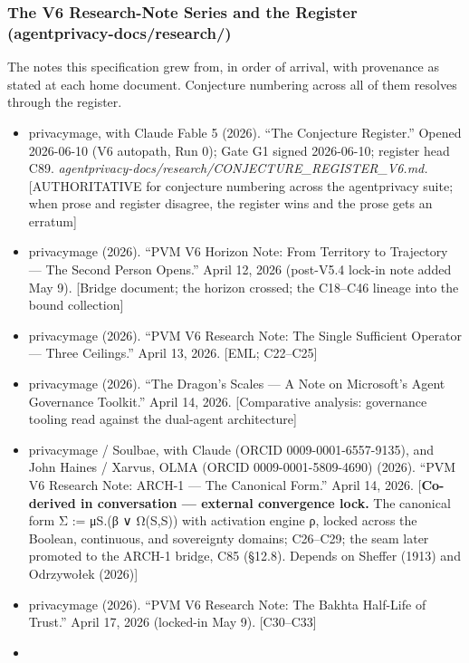 \documentclass[
  11pt,
]{article}
\providecommand{\tightlist}{%
  \setlength{\itemsep}{0pt}\setlength{\parskip}{0pt}}
\begin{document}
\subsubsection{The V6 Research-Note Series and the Register
(agentprivacy-docs/research/)}\label{the-v6-research-note-series-and-the-register-agentprivacy-docsresearch}

The notes this specification grew from, in order of arrival, with
provenance as stated at each home document. Conjecture numbering across
all of them resolves through the register.

\begin{itemize}
\tightlist
\item
  privacymage, with Claude Fable 5 (2026). ``The Conjecture Register.''
  Opened 2026-06-10 (V6 autopath, Run 0); Gate G1 signed 2026-06-10;
  register head C89.
  \emph{agentprivacy-docs/research/CONJECTURE\_REGISTER\_V6.md.}
  {[}AUTHORITATIVE for conjecture numbering across the agentprivacy
  suite; when prose and register disagree, the register wins and the
  prose gets an erratum{]}
\item
  privacymage (2026). ``PVM V6 Horizon Note: From Territory to
  Trajectory --- The Second Person Opens.'' April 12, 2026 (post-V5.4
  lock-in note added May 9). {[}Bridge document; the horizon crossed;
  the C18--C46 lineage into the bound collection{]}
\item
  privacymage (2026). ``PVM V6 Research Note: The Single Sufficient
  Operator --- Three Ceilings.'' April 13, 2026. {[}EML; C22--C25{]}
\item
  privacymage (2026). ``The Dragon's Scales --- A Note on Microsoft's
  Agent Governance Toolkit.'' April 14, 2026. {[}Comparative analysis:
  governance tooling read against the dual-agent architecture{]}
\item
  privacymage / Soulbae, with Claude (ORCID 0009-0001-6557-9135), and
  John Haines / Xarvus, OLMA (ORCID 0009-0001-5809-4690) (2026). ``PVM
  V6 Research Note: ARCH-1 --- The Canonical Form.'' April 14, 2026.
  {[}\textbf{Co-derived in conversation --- external convergence lock.}
  The canonical form Σ := μS.(β ∨ Ω(S,S)) with activation engine ρ,
  locked across the Boolean, continuous, and sovereignty domains;
  C26--C29; the seam later promoted to the ARCH-1 bridge, C85 (§12.8).
  Depends on Sheffer (1913) and Odrzywołek (2026){]}
\item
  privacymage (2026). ``PVM V6 Research Note: The Bakhta Half-Life of
  Trust.'' April 17, 2026 (locked-in May 9). {[}C30--C33{]}
\item

\end{itemize}
\end{document}
